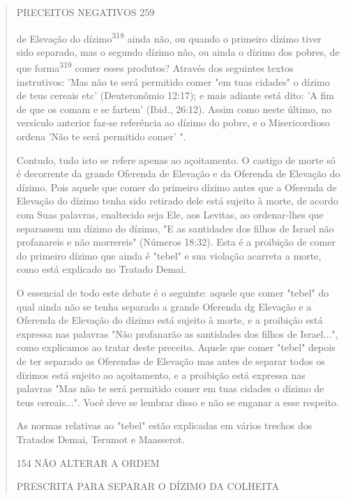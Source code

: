 \begin{quote}
PRECEITOS NEGATIVOS 259

de Elevação do dízimo\textsuperscript{318} ainda não, ou quando o
primeiro dízimo tiver sido separado, mas o segundo dízimo não, ou ainda
o dízimo dos pobres, de que forma\textsuperscript{319} comer esses
produtos? Através dos seguintes textos instrutivos: 'Mas não te será
permitido comer "em tuas cidades" o dízimo de teus cereais etc'
(Deuteronômio 12:17); e mais adiante está dito: 'A fim de que os comam e
se fartem' (Ibid., 26:12). Assim como neste último, no versículo
anterior faz-se re­ferência ao dízimo do pobre, e o Misericordioso
ordena 'Não te será permitido comer' ".

Contudo, tudo isto se refere apenas ao açoitamento. O castigo de morte
só é decorrente da grande Oferenda de Elevação e da Oferenda de
Ele­vação do dízimo. Pois aquele que comer do primeiro dízimo antes que
a Ofe­renda de Elevação do dízimo tenha sido retirado dele está sujeito
à morte, de acordo com Suas palavras, enaltecido seja Ele, aos Levitas,
ao ordenar-lhes que separassem um dízimo do dízimo, "E as santidades dos
filhos de Israel não pro­fanareis e não morrereis" (Números 18:32). Esta
é a proibição de comer do pri­meiro dízimo que ainda é "tebel" e sua
violação acarreta a morte, como está explicado no Tratado Demai.

O essencial de todo este debate é o seguinte: aquele que comer "te­bel"
do qual ainda não se tenha separado a grande Oferenda dg Elevação e a
Oferenda de Elevação do dízimo está sujeito à morte, e a proibição está
expres­sa nas palavras "Não profanarão as santidades dos filhos de
Israel...", como ex­plicamos ao tratar deste preceito. Aquele que comer
"tebel" depois de ter se­parado as Oferendas de Elevação mas antes de
separar todos os dízimos está sujeito ao açoitamento, e a proibição está
expressa nas palavras "Mas não te será permitido comer em tuas cidades o
dízimo de teus cereais...". Você deve se lembrar disso e não se enganar
a esse respeito.

As normas relativas ao "tebel" estão explicadas em vários trechos dos
Tratados Demai, Terumot e Maasserot.

154 NÃO ALTERAR A ORDEM

PRESCRITA PARA SEPARAR O DÍZIMO DA COLHEITA


\end{quote}
